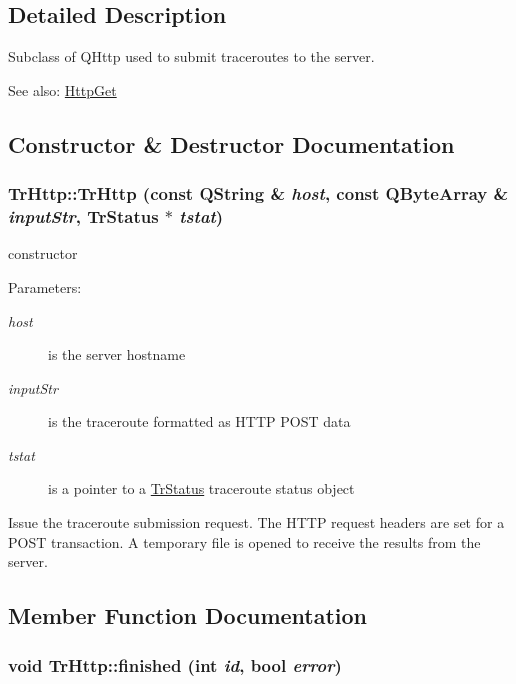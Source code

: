 \subsection{Detailed Description}
Subclass of QHttp used to submit traceroutes to the server. \begin{Desc}
\item[See also:]\hyperlink{classHttpGet}{HttpGet} \end{Desc}


\subsection{Constructor \& Destructor Documentation}
\hypertarget{classTrHttp_9ec9dba1353faa4c18ed4da5a15b2e6b}{
\subsubsection[TrHttp]{\setlength{\rightskip}{0pt plus 5cm}TrHttp::TrHttp (const QString \& {\em host}, \/  const QByteArray \& {\em inputStr}, \/  {\bf TrStatus} $\ast$ {\em tstat})}}
\label{classTrHttp_9ec9dba1353faa4c18ed4da5a15b2e6b}


constructor \begin{Desc}
\item[Parameters:]
\begin{description}
\item[{\em host}]is the server hostname \item[{\em inputStr}]is the traceroute formatted as HTTP POST data \item[{\em tstat}]is a pointer to a \hyperlink{classTrStatus}{TrStatus} traceroute status object\end{description}
\end{Desc}
Issue the traceroute submission request. The HTTP request headers are set for a POST transaction. A temporary file is opened to receive the results from the server. 

\subsection{Member Function Documentation}
\hypertarget{classTrHttp_a1a518e5b0ba5501345888512a74199c}{
\subsubsection[finished]{\setlength{\rightskip}{0pt plus 5cm}void TrHttp::finished (int {\em id}, \/  bool {\em error})}}
\label{classTrHttp_a1a518e5b0ba5501345888512a74199c}


